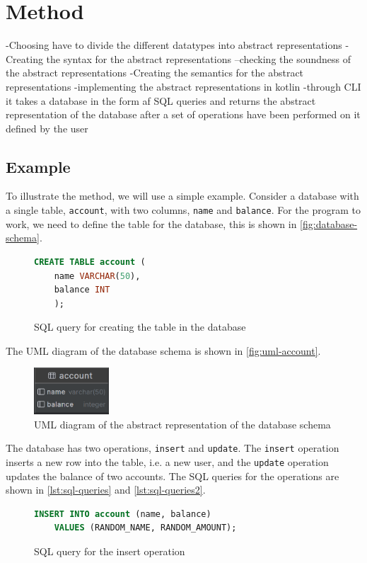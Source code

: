 \section{Method}
\label{sec:method}
-Choosing have to divide the different datatypes into abstract representations
-Creating the syntax for the abstract representations
--checking the soundness of the abstract representations
-Creating the semantics for the abstract representations
-implementing the abstract representations in kotlin
-through CLI it takes a database in the form af SQL queries and returns the abstract representation of the database after a set of operations have been performed on it defined by the user


\subsection{Example}\label{subsec:example}
To illustrate the method, we will use a simple example.
Consider a database with a single table, \texttt{account}, with two columns, \texttt{name} and \texttt{balance}.
For the program to work, we need to define the table for the database, this is shown in \autoref{fig:database-schema}.

\begin{figure}[htb!]
\begin{lstlisting}[language=SQL]
    CREATE TABLE account (
    name VARCHAR(50),
    balance INT
    );
\end{lstlisting}
\caption{SQL query for creating the table in the database}
\label{fig:database-schema}
\end{figure}

The UML diagram of the database schema is shown in \autoref{fig:uml-account}.

\begin{figure}[htb!]
    \centering
    \includegraphics[width=0.25\textwidth]{figures/account.png}
    \caption{UML diagram of the abstract representation of the database schema}
    \label{fig:uml-account}
\end{figure}

The database has two operations, \texttt{insert} and \texttt{update}.
The \texttt{insert} operation inserts a new row into the table, i.e. a new user, and the \texttt{update} operation updates the balance of two accounts.
The SQL queries for the operations are shown in \autoref{lst:sql-queries} and \autoref{lst:sql-queries2}.
\begin{figure}
\begin{lstlisting}[language=SQL]
    INSERT INTO account (name, balance)
    VALUES (RANDOM_NAME, RANDOM_AMOUNT);
\end{lstlisting}
\label{lst:sql-queries}
\caption{SQL query for the insert operation}
\end{figure}

